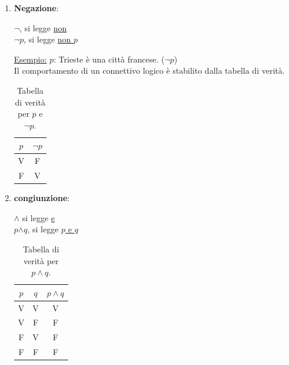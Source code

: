         \begin{enumerate}
            \item \textbf{Negazione}:
                \begin{flushleft}
                    \(\neg\), si legge \underline{non} \\
                    \(\neg p\), si legge \underline{non \( p \)}
                \end{flushleft}
                \vspace{1em} 
                \underline{Esempio:} \( p \): Trieste è una città francese. (\(\neg p\)) \\
    
                Il comportamento di un connettivo logico è stabilito dalla tabella di verità. \\
    
                \begin{table}[h!]
                    \centering
                    \begin{tabular}{|c|c|}
                        \hline
                        $p$ & $\neg p$ \\
                        \hline
                        V & F \\
                        F & V \\
                        \hline
                    \end{tabular}
                    \caption{Tabella di verità per $p$ e $\neg p$.}
                \end{table}
        
            \item \textbf{congiunzione}: 
                \begin{flushleft}
                    \(\land\) si legge \underline{e} \\
                   \( p \)\(\land\)\( q \), si legge \underline{\( p \) e \( q \)}
                \end{flushleft}
    
                \begin{table}[h!]
                    \centering
                    \begin{tabular}{|c|c|c|}
                        \hline
                        $p$ & $q$ & $p \land q$ \\
                        \hline
                        V & V & V \\
                        V & F & F \\
                        F & V & F \\
                        F & F & F \\
                        \hline
                    \end{tabular}
                    \caption{Tabella di verità per $p \land q$.}
                \end{table}
    

\end{enumerate}
